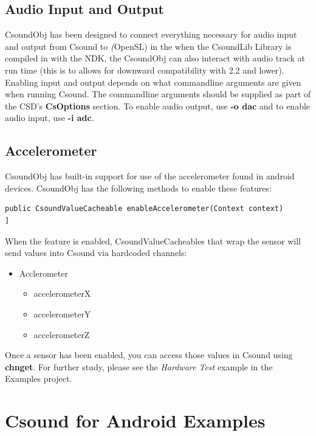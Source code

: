 \documentclass[11pt]{article}
\begin{document}
\subsection{Audio Input and Output}

CsoundObj has been designed to connect everything necessary for audio input and output from Csound to \textit(OpenSL) in the when the CsoundLib Library is compiled in with the NDK, the CsoundObj can also interact with audio track at run time (this is to allows for  downward compatibility with 2.2 and lower).  Enabling input and output depends on what commandline arguments are given when running Csound.  The commandline arguments should be supplied as part of the CSD's \textbf{CsOptions} section.  To enable audio output, use \textbf{-o dac} and to enable audio input, use \textbf{-i adc}. 

\subsection{Accelerometer}

CsoundObj has built-in support for use of the accelerometer found in android devices. CsoundObj has the following methods to enable these features:


\begin{lstlisting}[caption=CsoundObj Accelerometer Method]
public CsoundValueCacheable enableAccelerometer(Context context)
]
\end{lstlisting}

When the feature is enabled, CsoundValueCacheables that wrap the sensor will send values into Csound via hardcoded channels:

\begin{itemize}

\item Acclerometer
\begin{itemize}
\item accelerometerX
\item accelerometerY
\item accelerometerZ
\end{itemize}

\end{itemize} 

Once a sensor has been enabled, you can access those values in Csound using \textbf{chnget}. For further study, please see the \emph{Hardware Test} example in the Examples project. 


\section{Csound for Android Examples}
\end{document}
